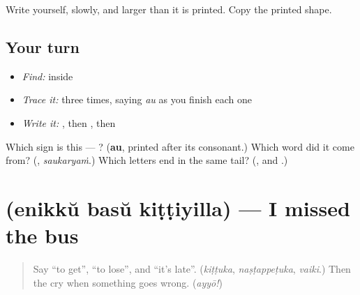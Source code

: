 Write \textbf{} yourself, slowly, and larger than it is printed. Copy the printed shape.

\subsection*{Your turn}
\begin{itemize}
\raggedright
  \item \emph{Find:}  inside \textbf{}
  \item \emph{Trace it:}  three times, saying \emph{au} as you finish each one
  \item \emph{Write it:} \textbf{}, then \textbf{}, then \textbf{}
\end{itemize}

\begin{tcolorbox}[breakable,colback=teal!4,colframe=teal!35!black,title={Before you move on}]
Which sign is this — ? (\textbf{au}, printed after its consonant.) Which word did it come from? (\textbf{}, \emph{saukaryaṁ}.) Which letters end in the same tail? (\textbf{}, \textbf{} and \textbf{}.)
\end{tcolorbox}
\section[\texorpdfstring{\ml{എനിക്ക്} \ml{ബസ്} \ml{കിട്ടിയില്ല} (enikkŭ basŭ …)}{എനിക്ക് ബസ് കിട്ടിയില്ല (enikkŭ basŭ …)}]{   (enikkŭ basŭ kiṭṭiyilla) — I missed the bus}

\label{lesson:ML-C344-bus-kittiyilla}



\begin{quote}
Say \textquotedblleft{}to get\textquotedblright{}, \textquotedblleft{}to lose\textquotedblright{}, and \textquotedblleft{}it's late\textquotedblright{}. (\emph{kiṭṭuka}, \emph{naṣṭappeṭuka}, \emph{vaiki}.) Then the cry when something goes wrong. (\emph{ayyō!})
\end{quote}

